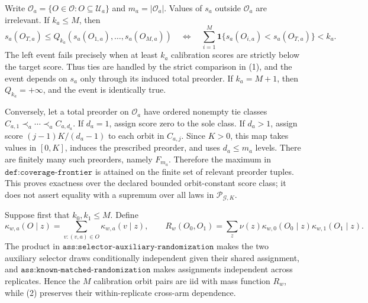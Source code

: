 Write \(\mathcal O_a=\{O\in\mathcal O:O\subseteq\mathcal U_a\}\) and \(m_a=|\mathcal O_a|\). Values of \(s_a\) outside \(\mathcal O_a\) are irrelevant. If \(k_a\le M\), then
\[
s_a(O_{T,a})\le Q_{k_a}(s_a(O_{1,a}),\ldots,s_a(O_{M,a}))
\quad\Longleftrightarrow\quad
\sum_{i=1}^M\mathbf 1\{s_a(O_{i,a})<s_a(O_{T,a})\}<k_a.
\tag{1}
\]
The left event fails precisely when at least \(k_a\) calibration scores are strictly below the target score. Thus ties are handled by the strict comparison in (1), and the event depends on \(s_a\) only through its induced total preorder. If \(k_a=M+1\), then \(Q_{k_a}=+\infty\), and the event is identically true.

Conversely, let a total preorder on \(\mathcal O_a\) have ordered nonempty tie classes \(C_{a,1}\prec_a\cdots\prec_a C_{a,d_a}\). If \(d_a=1\), assign score zero to the sole class. If \(d_a>1\), assign score \((j-1)K/(d_a-1)\) to each orbit in \(C_{a,j}\). Since \(K>0\), this map takes values in \([0,K]\), induces the prescribed preorder, and uses \(d_a\le m_a\) levels. There are finitely many such preorders, namely \(F_{m_a}\). Therefore the maximum in \(\texttt{def:coverage-frontier}\) is attained on the finite set of relevant preorder tuples. This proves exactness over the declared bounded orbit-constant score class; it does not assert equality with a supremum over all laws in \(\mathcal P_{\mathcal G,K}\).

Suppose first that \(k_0,k_1\le M\). Define
\[
\kappa_{w,a}(O\mid z)=\sum_{v:(v,a)\in O}\kappa_{w,a}(v\mid z),\qquad
R_w(O_0,O_1)=\sum_z\nu(z)\kappa_{w,0}(O_0\mid z)\kappa_{w,1}(O_1\mid z).
\tag{2}
\]
The product in \(\texttt{ass:selector-auxiliary-randomization}\) makes the two auxiliary selector draws conditionally independent given their shared assignment, and \(\texttt{ass:known-matched-randomization}\) makes assignments independent across replicates. Hence the \(M\) calibration orbit pairs are iid with mass function \(R_w\), while (2) preserves their within-replicate cross-arm dependence.

